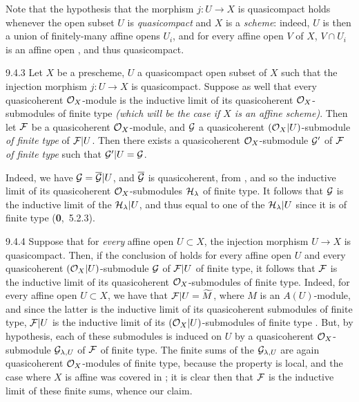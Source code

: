 \documentclass[../main.tex]{subfiles}
\begin{document}
Note that the hypothesis that the morphism $j\colon U\to X$ is quasicompact
holds whenever the open subset $U$ is \emph{quasicompact} and $X$ is a
\emph{scheme}: indeed, $U$ is then a union of finitely-many affine opens $U_i$,
and for every affine open $V$ of $X$, $V\cap U_i$ is an affine open , and
thus quasicompact.
 
\begin{env}[Corollary]{9.4.3}
Let $X$ be a prescheme, $U$ a quasicompact open
subset of $X$ such that the injection morphism $j\colon U\to X$ is
quasicompact. Suppose as well that every quasicoherent $\mathcal{O}_X$-module is the
inductive limit of its quasicoherent $\mathcal{O}_X$-submodules of finite type
\emph{(which will be the case if $X$ is an \emph{affine scheme})}.  Then let
$\mathcal{F}$ be a quasicoherent $\mathcal{O}_X$-module, and $\mathcal{G}$ a quasicoherent
$(\mathcal{O}_X|U)$-submodule \emph{of finite type} of $\mathcal{F}|U$. Then there exists
a quasicoherent $\mathcal{O}_X$-submodule $\mathcal{G}'$ of $\mathcal{F}$ \emph{of finite
type} such that $\mathcal{G}'|U=\mathcal{G}$.
\end{env}
 
Indeed, we have $\mathcal{G}=\overline{\mathcal{G}}|U$, and $\overline{\mathcal{G}}$
is quasicoherent, from , and so the inductive limit of its
quasicoherent $\mathcal{O}_X$-submodules $\mathcal{H}_\lambda$ of finite type.  It
follows that $\mathcal{G}$ is the inductive limit of the $\mathcal{H}_\lambda|U$,
and thus equal to one of the $\mathcal{H}_\lambda|U$ since it is of finite type
(\textbf{0},~5.2.3).
 
\begin{env}[Remark]{9.4.4}
Suppose that for \emph{every} affine open $U\subset
X$, the injection morphism $U\to X$ is quasicompact. Then, if the conclusion
of  holds for every affine open $U$ and every quasicoherent
$(\mathcal{O}_X|U)$-submodule $\mathcal{G}$ of $\mathcal{F}|U$ of finite type, it
follows that $\mathcal{F}$ is the inductive limit of its
quasicoherent $\mathcal{O}_X$-submodules of finite type. Indeed, for every affine open
$U\subset X$, we have that $\mathcal{F}|U=\widetilde{M}$, where $M$ is an
$A(U)$-module, and since the latter is the inductive limit of its quasicoherent
submodules of finite type, $\mathcal{F}|U$ is the inductive limit of its
$(\mathcal{O}_X|U)$-submodules of finite type . But, by hypothesis, each of
these submodules is induced on $U$ by a quasicoherent $\mathcal{O}_X$-submodule
$\mathcal{G}_{\lambda,U}$ of $\mathcal{F}$ of finite type. The finite sums of the
$\mathcal{G}_{\lambda,U}$ are again quasicoherent $\mathcal{O}_X$-modules of finite type,
because the property is local, and the case where $X$ is affine was covered in
; it is clear then that $\mathcal{F}$ is the inductive limit of these
finite sums, whence our claim.
\end{env}
 
\end{document}
